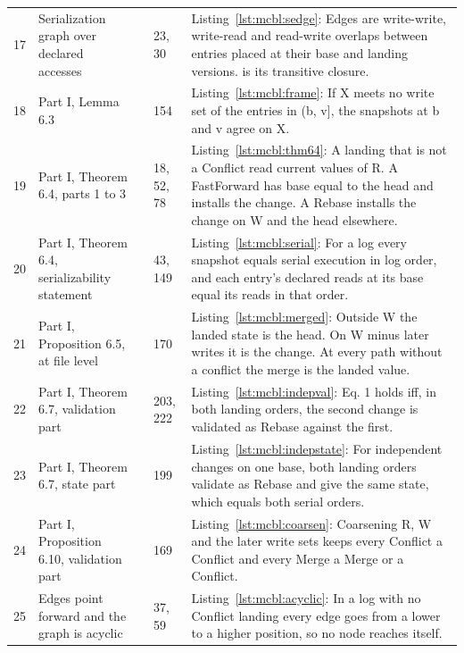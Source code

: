 \documentclass[11pt,letterpaper]{article}
\theoremstyle{definition}
\theoremstyle{remark}
\begin{document}
\begin{small}
\begin{longtable}{@{}L{0.8cm}L{3.4cm}L{3.6cm}L{1.3cm}L{5.4cm}@{}}
17 & Serialization graph over declared accesses &  & 23, 30 & Listing~\ref{lst:mcbl:sedge}: Edges are write-write, write-read and read-write overlaps between entries placed at their base and landing versions.  is its transitive closure. \\
18 & Part I, Lemma 6.3 &  & 154 & Listing~\ref{lst:mcbl:frame}: If X meets no write set of the entries in (b, v], the snapshots at b and v agree on X. \\
19 & Part I, Theorem 6.4, parts 1 to 3 &  & 18, 52, 78 & Listing~\ref{lst:mcbl:thm64}: A landing that is not a Conflict read current values of R. A FastForward has base equal to the head and installs the change. A Rebase installs the change on W and the head elsewhere. \\
20 & Part I, Theorem 6.4, serializability statement &  & 43, 149 & Listing~\ref{lst:mcbl:serial}: For a  log every snapshot equals serial execution in log order, and each entry's declared reads at its base equal its reads in that order. \\
21 & Part I, Proposition 6.5, at file level &  & 170 & Listing~\ref{lst:mcbl:merged}: Outside W the landed state is the head. On W minus later writes it is the change. At every path without a conflict the merge is the landed value. \\
22 & Part I, Theorem 6.7, validation part &  & 203, 222 & Listing~\ref{lst:mcbl:indepval}: Eq. 1 holds iff, in both landing orders, the second change is validated as Rebase against the first. \\
23 & Part I, Theorem 6.7, state part &  & 199 & Listing~\ref{lst:mcbl:indepstate}: For independent changes on one base, both landing orders validate as Rebase and give the same state, which equals both serial orders. \\
24 & Part I, Proposition 6.10, validation part &  & 169 & Listing~\ref{lst:mcbl:coarsen}: Coarsening R, W and the later write sets keeps every Conflict a Conflict and every Merge a Merge or a Conflict. \\
25 & Edges point forward and the graph is acyclic &  & 37, 59 & Listing~\ref{lst:mcbl:acyclic}: In a log with no Conflict landing every edge goes from a lower to a higher position, so no node reaches itself. \\

\end{longtable}
\end{small}
\end{document}
